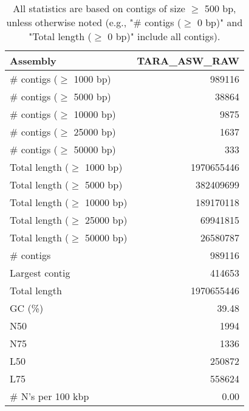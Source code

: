\documentclass[12pt,a4paper]{article}
\begin{document}
\begin{table}[ht]
\begin{center}
\caption{All statistics are based on contigs of size $\geq$ 500 bp, unless otherwise noted (e.g., "\# contigs ($\geq$ 0 bp)" and "Total length ($\geq$ 0 bp)" include all contigs).}
\begin{tabular}{|l*{1}{|r}|}
\hline
Assembly & TARA\_ASW\_RAW \\ \hline
\# contigs ($\geq$ 1000 bp) & 989116 \\ \hline
\# contigs ($\geq$ 5000 bp) & 38864 \\ \hline
\# contigs ($\geq$ 10000 bp) & 9875 \\ \hline
\# contigs ($\geq$ 25000 bp) & 1637 \\ \hline
\# contigs ($\geq$ 50000 bp) & 333 \\ \hline
Total length ($\geq$ 1000 bp) & 1970655446 \\ \hline
Total length ($\geq$ 5000 bp) & 382409699 \\ \hline
Total length ($\geq$ 10000 bp) & 189170118 \\ \hline
Total length ($\geq$ 25000 bp) & 69941815 \\ \hline
Total length ($\geq$ 50000 bp) & 26580787 \\ \hline
\# contigs & 989116 \\ \hline
Largest contig & 414653 \\ \hline
Total length & 1970655446 \\ \hline
GC (\%) & 39.48 \\ \hline
N50 & 1994 \\ \hline
N75 & 1336 \\ \hline
L50 & 250872 \\ \hline
L75 & 558624 \\ \hline
\# N's per 100 kbp & 0.00 \\ \hline
\end{tabular}
\end{center}
\end{table}
\end{document}
